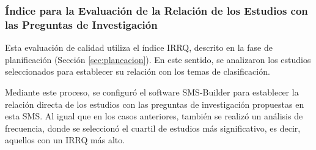 \subsubsection{Índice para la Evaluación de la Relación de los Estudios con las Preguntas de Investigación}
Esta evaluación de calidad utiliza el índice IRRQ, descrito en la fase de planificación (Sección \ref{sec:planeacion}). En este sentido, se analizaron los estudios seleccionados para establecer su relación con los temas de clasificación.

Mediante este proceso, se configuró el software SMS-Builder \cite{sms-builder-repo} para establecer la relación directa de los estudios con las preguntas de investigación propuestas en esta SMS. Al igual que en los casos anteriores, también se realizó un análisis de frecuencia, donde se seleccionó el cuartil de estudios más significativo, es decir, aquellos con un IRRQ más alto.
